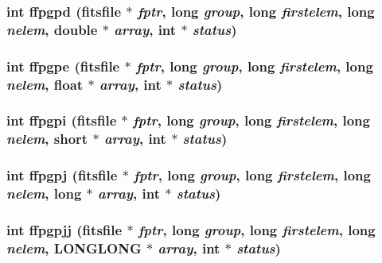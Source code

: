 \subsubsection{\setlength{\rightskip}{0pt plus 5cm}int ffpgpd (\bf{fitsfile} $\ast$ {\em fptr}, long {\em group}, long {\em firstelem}, long {\em nelem}, double $\ast$ {\em array}, int $\ast$ {\em status})}\label{test_2shm__client_2fitsio_8h_b2514ceeffca00632422779c417addde}


\subsubsection{\setlength{\rightskip}{0pt plus 5cm}int ffpgpe (\bf{fitsfile} $\ast$ {\em fptr}, long {\em group}, long {\em firstelem}, long {\em nelem}, float $\ast$ {\em array}, int $\ast$ {\em status})}\label{test_2shm__client_2fitsio_8h_abe2ba2dbe3ad752ea0f1e3d5c9e3738}


\subsubsection{\setlength{\rightskip}{0pt plus 5cm}int ffpgpi (\bf{fitsfile} $\ast$ {\em fptr}, long {\em group}, long {\em firstelem}, long {\em nelem}, short $\ast$ {\em array}, int $\ast$ {\em status})}\label{test_2shm__client_2fitsio_8h_79ed21c51b7e326b6dea43a404809482}


\subsubsection{\setlength{\rightskip}{0pt plus 5cm}int ffpgpj (\bf{fitsfile} $\ast$ {\em fptr}, long {\em group}, long {\em firstelem}, long {\em nelem}, long $\ast$ {\em array}, int $\ast$ {\em status})}\label{test_2shm__client_2fitsio_8h_96654291cfc9e689d5412b72f4441847}


\subsubsection{\setlength{\rightskip}{0pt plus 5cm}int ffpgpjj (\bf{fitsfile} $\ast$ {\em fptr}, long {\em group}, long {\em firstelem}, long {\em nelem}, \bf{LONGLONG} $\ast$ {\em array}, int $\ast$ {\em status})}\label{test_2shm__client_2fitsio_8h_934bf463621eb782e48e595feea0acc8}


